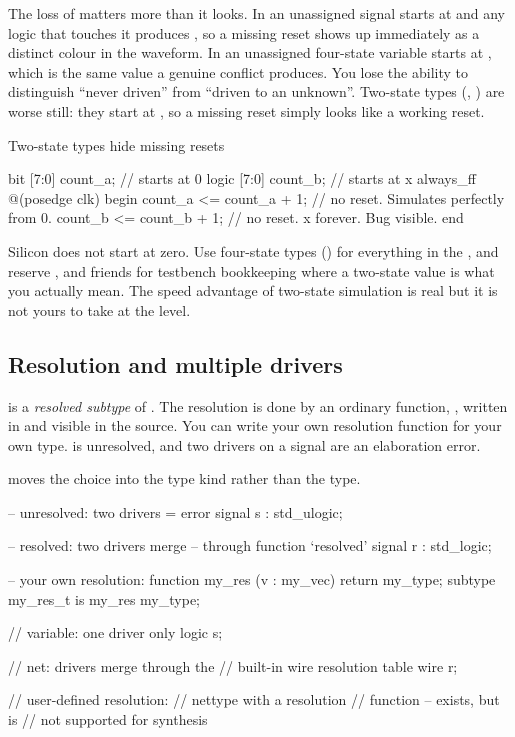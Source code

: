 The loss of  matters more than it looks. In \VHDL{} an unassigned
signal starts at  and any logic that touches it produces ,
so a missing reset shows up immediately as a distinct colour in the waveform.
In \SV{} an unassigned four-state variable starts at , which is the
same value a genuine conflict produces. You lose the ability to distinguish
``never driven'' from ``driven to an unknown''. Two-state types (,
) are worse still: they start at , so a missing reset simply
looks like a working reset.

\begin{gotcha}{Two-state types hide missing resets}
\begin{svcode}
bit   [7:0] count_a;    // starts at 0
logic [7:0] count_b;    // starts at x
always_ff @(posedge clk) begin
  count_a <= count_a + 1;   // no reset. Simulates perfectly from 0.
  count_b <= count_b + 1;   // no reset. x forever. Bug visible.
end
\end{svcode}
Silicon does not start at zero. Use four-state types () for
everything in the \RTL{}, and reserve ,  and friends for
testbench bookkeeping where a two-state value is what you actually mean. The
speed advantage of two-state simulation is real but it is not yours to take at
the \RTL{} level.
\end{gotcha}

\subsection{Resolution and multiple drivers}


 is a \emph{resolved subtype} of . The
resolution is done by an ordinary \VHDL{} function, , written in
 and visible in the source. You can write your own
resolution function for your own type.  is unresolved, and
two drivers on a  signal are an elaboration error.

\SV{} moves the choice into the type kind rather than the type.

\begin{rosetta}
\begin{rleft}
-- unresolved: two drivers = error
signal s : std_ulogic;

-- resolved: two drivers merge
-- through function `resolved'
signal r : std_logic;

-- your own resolution:
function my_res (v : my_vec)
  return my_type;
subtype my_res_t is
  my_res my_type;
\end{rleft}
\begin{rright}
// variable: one driver only
logic s;

// net: drivers merge through the
// built-in wire resolution table
wire r;

// user-defined resolution:
//   nettype with a resolution
//   function -- exists, but is
//   not supported for synthesis
\end{rright}
\end{rosetta}

